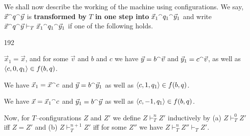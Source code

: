 We shall now describe the working of the machine using configurations.
We say,
$\vec{x} {^{\smallfrown}} q {^{\smallfrown}} \vec{y}$ is \textbf{transformed by} $T$
\textbf{in one step into} $\vec{x}_1 {^{\smallfrown}} q_1 {^{\smallfrown}} \vec{y}_1$
and write $\vec{x} {^{\smallfrown}} q {^{\smallfrown}} \vec{y} \vdash_T
\vec{x}_1 {^{\smallfrown}} q_1 {^{\smallfrown}} \vec{y}_1$ if one of the following
holds.
\begin{dingautolist}{192}
\item $\vec{x}_1 = \vec{x}$, and for some $\vec{v}$ and
    $b$ and $c$ we have
    $\vec{y} = b {^{\smallfrown}} \vec{v}$ and $\vec{y}_1 = c {^{\smallfrown}}  \vec{v}$,
    as well as $\langle c, 0, q_1\rangle  \in f(b,q)$.
\item We have $\vec{x}_1 = \vec{x} {^{\smallfrown}} c$ and
    $\vec{y} = b {^{\smallfrown}} \vec{y}_1$ as well as
     $\langle c, 1, q_1\rangle \in f(b,q)$.
\item We have $\vec{x} = \vec{x}_1 {^{\smallfrown}} c$ and
    $\vec{y}_1 = b {^{\smallfrown}} \vec{y}$
    as well as $\langle c, -1, q_1\rangle \in f(b,q)$.
\end{dingautolist}
Now, for $T$--configurations
$Z$ and $Z'$ we define $Z \vdash^n_T Z'$ inductively by
(a) $Z \vdash_T^0 Z'$ iff $Z = Z'$ and
(b) $Z \vdash_T^{n+1} Z'$ iff for some $Z''$
we have $Z \vdash_T^n Z'' \vdash_T Z'$.

